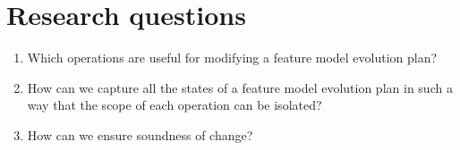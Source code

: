 




\section{Research questions}
\label{sec:research-questions}

\begin{enumerate}[\itbf{RQ\arabic*}, itemsep=0mm]
   \item Which operations are useful for modifying a feature model evolution plan?
   \item How can we capture all the states of a feature model evolution plan in such a way that the scope of each operation can be isolated?
   \item How can we ensure soundness of change?
\end{enumerate}

